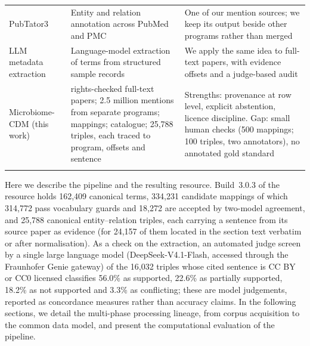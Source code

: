 \documentclass[referee,lineno,pdflatex,sn-vancouver-num]{sn-jnl}
\theoremstyle{thmstyleone}%
\theoremstyle{thmstyletwo}%
\theoremstyle{thmstylethree}%
\begin{document}
\begin{table}[!t]
\begin{tabular}{@{}>{\raggedright\arraybackslash}p{}>{\raggedright\arraybackslash}p{}>{\raggedright\arraybackslash}p{}@{}}
PubTator3~\cite{wei2024pubtator3} & Entity and relation annotation across PubMed and PMC & One of our mention sources; we keep its output beside other programs rather than merged \\
LLM metadata extraction~\cite{ikeda2025biosample} & Language-model extraction of terms from structured sample records & We apply the same idea to full-text papers, with evidence offsets and a judge-based audit \\
\midrule
Microbiome-CDM (this work) & 453 rights-checked full-text papers; 2.5 million mentions from separate programs; mappings; catalogue; 25,788 triples, each traced to program, offsets and sentence & Strengths: provenance at row level, explicit abstention, licence discipline. Gap: small human checks (500 mappings; 100 triples, two annotators), no annotated gold standard \\
\botrule
\end{tabular}
\end{table}

Here we describe the pipeline and the resulting resource. Build~3.0.3 of the
resource holds
162,409 canonical terms, 334,231 candidate mappings of which 314,772 pass
vocabulary guards and 18,272 are accepted by two-model agreement, and 25,788
canonical entity--relation triples, each carrying a sentence from its
source paper as evidence (for 24,157 of them located in the section text
verbatim or after normalisation). As a check on the extraction, an automated judge
screen by a single large language model (DeepSeek-V4.1-Flash, accessed through
the Fraunhofer Genie gateway) of the 16,032 triples whose cited sentence is CC BY
or CC0 licensed
classifies 56.0\% as supported, 22.6\% as partially supported, 18.2\% as not
supported and 3.3\% as conflicting; these are model judgements, reported as
concordance measures rather than accuracy claims. In the following sections, we
detail the multi-phase processing lineage, from corpus acquisition to the
common data model, and present the computational evaluation of the pipeline.
\end{document}
